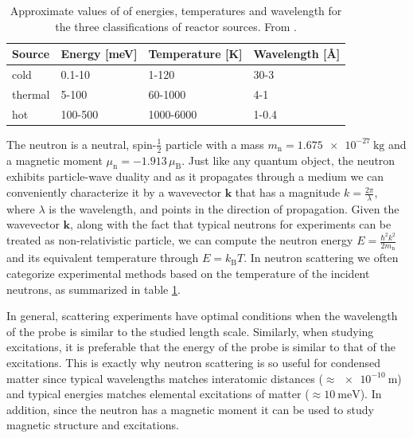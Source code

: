 \begin{table}
	\caption[Neutron Temperatures]{Approximate values of of energies, temperatures and wavelength for the three classifications of reactor sources. From \cite{Squires2012}.}
	\label{fig:neutron_temperatures}
	\centering
	\begin{tabular}{@{}llll@{}}
		\toprule
		Source  & Energy [meV] & Temperature [K] & Wavelength [\AA]  \\ \midrule
		cold    & 0.1-10       & 1-120           & 30-3               \\
		thermal & 5-100        & 60-1000         & 4-1                \\
		hot     & 100-500      & 1000-6000       & 1-0.4              \\ \bottomrule
		\end{tabular}
\end{table}

The neutron is a neutral, spin-$\frac{1}{2}$ particle with a mass $m_\text{n} = \SI{1.675e-27}{\kilo\gram}$ and a magnetic moment $\mu_\text{n} = -1.913 \, \mu_\text{B}$. Just like any quantum object, the neutron exhibits particle-wave duality and as it propagates through a medium we can conveniently characterize it by a wavevector $\bm{k}$ that has a magnitude $k = \frac{2\pi}{\lambda}$, where $\lambda$ is the wavelength, and points in the direction of propagation. Given the wavevector $\bm{k}$, along with the fact that typical neutrons for experiments can be treated as non-relativistic particle, we can compute the neutron energy $E = \frac{\hbar^2 k^2}{2m_\text{n}}$ and its equivalent temperature through $E = k_\text{B}T$. In neutron scattering we often categorize experimental methods based on the temperature of the incident neutrons, as summarized in table \ref{fig:neutron_temperatures}. 

In general, scattering experiments have optimal conditions when the wavelength of the probe is similar to the studied length scale. Similarly, when studying excitations, it is preferable that the energy of the probe is similar to that of the excitations. This is exactly why neutron scattering is so useful for condensed matter since typical wavelengths matches interatomic distances ($\approx \SI{e-10}{\meter}$) and typical energies matches elemental excitations of matter ($\approx \SI{10}{\milli\eV}$). In addition, since the neutron has a magnetic moment it can be used to study magnetic structure and excitations.

